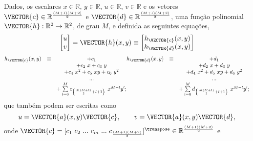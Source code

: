 \begin{myproofT}\label{proof:theo:maphxr2r2}
Dados,
os escalares $x \in \mathbb{R}$, $y \in \mathbb{R}$, $u \in \mathbb{R}$, $v \in \mathbb{R}$ e 
os vetores $\VECTOR{c} \in \mathbb{R}^{\frac{(M+1)(M+2)}{2}}$ e $\VECTOR{d} \in \mathbb{R}^{\frac{(M+1)(M+2)}{2}}$,
uma função polinomial $\VECTOR{h}:\mathbb{R}^2 \rightarrow \mathbb{R}^2$, de grau $M$, e 
definida as seguintes equações,
\begin{equation}\label{eq:proof:theo:maphxr2r2:0}
\begin{bmatrix}
u\\
v
\end{bmatrix}=
\VECTOR{h}(x,y)\equiv
\begin{bmatrix}
h_{\VECTOR{c}}(x,y)\\
h_{\VECTOR{d}}(x,y)
\end{bmatrix}
\end{equation}
\begin{equation}\label{eq:proof:theo:maphxr2r2:1}
\begin{matrix}
h_{\VECTOR{c}}(x,y) & \equiv & +c_{1}\\
              ~ & ~ & +c_{2}~x + c_{3}~y\\
              ~ & ~ & +c_{4}~x^2 +c_{5}~xy + c_{6}~y^2\\
              ~ & ~ &  ...\\
              ~ & ~ & +\sum \limits_{l=0}^{M}c_{\left\{ \frac{M(M+1)}{2}+l+1\right\}}~x^{M-l}y^{l};
\end{matrix}
\begin{matrix}
h_{\VECTOR{d}}(x,y) & \equiv & +d_{1}\\
              ~ & ~ & +d_{2}~x + d_{3}~y\\
              ~ & ~ & +d_{4}~x^2 +d_{5}~xy + d_{6}~y^2\\
              ~ & ~ &  ...\\
              ~ & ~ & +\sum \limits_{l=0}^{M}d_{\left\{ \frac{M(M+1)}{2}+l+1\right\}}~x^{M-l}y^{l};
\end{matrix}  
\end{equation}
que também podem ser escritas como
\begin{equation}
u=\VECTOR{a}(x,y)\VECTOR{c},
\qquad
v=\VECTOR{a}(x,y)\VECTOR{d},
\end{equation}
onde 
$\VECTOR{c}=[c_1~ c_2~ ...~ c_m~ ...~ c_{\frac{(M+1)(M+2)}{2}}]^{\transpose} \in \mathbb{R}^{\frac{(M+1)(M+2)}{2}}$ e

\end{myproofT}
